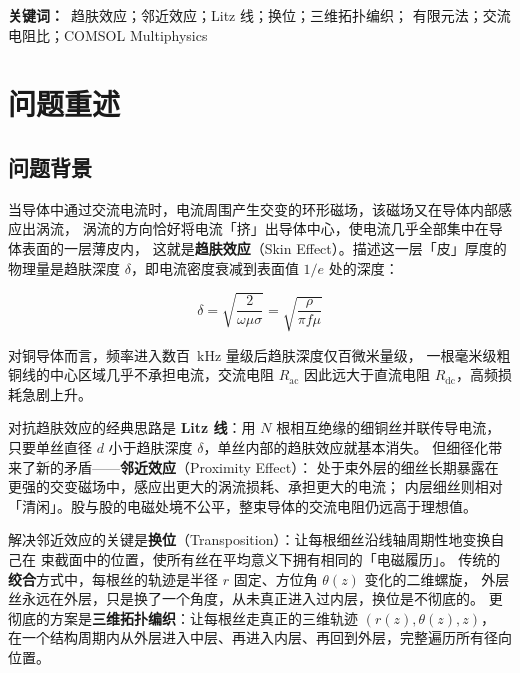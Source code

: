 \documentclass[12pt, a4paper]{ctexart}
\newcommand{\Rac}{R_{\mathrm{ac}}}
\newcommand{\Rdc}{R_{\mathrm{dc}}}
\newcommand{\U}[1]{\ensuremath{\,\mathrm{#1}}}
\begin{document}
\vspace{8pt}
\noindent\textbf{关键词：}\ 趋肤效应；邻近效应；Litz 线；换位；三维拓扑编织；
有限元法；交流电阻比；COMSOL Multiphysics

\newpage
\tableofcontents
\newpage

\section{问题重述}

\subsection{问题背景}

当导体中通过交流电流时，电流周围产生交变的环形磁场，该磁场又在导体内部感应出涡流，
涡流的方向恰好将电流「挤」出导体中心，使电流几乎全部集中在导体表面的一层薄皮内，
这就是\textbf{趋肤效应}（Skin Effect）。描述这一层「皮」厚度的物理量是趋肤深度
$\delta$，即电流密度衰减到表面值 $1/e$ 处的深度：

\begin{equation}
\delta = \sqrt{\frac{2}{\omega\mu\sigma}} = \sqrt{\frac{\rho}{\pi f \mu}}
\label{eq:delta}
\end{equation}

对铜导体而言，频率进入数百 $\U{kHz}$ 量级后趋肤深度仅百微米量级，
一根毫米级粗铜线的中心区域几乎不承担电流，交流电阻 $\Rac$ 因此远大于直流电阻
$\Rdc$，高频损耗急剧上升。

对抗趋肤效应的经典思路是 \textbf{Litz 线}：用 $N$ 根相互绝缘的细铜丝并联传导电流，
只要单丝直径 $d$ 小于趋肤深度 $\delta$，单丝内部的趋肤效应就基本消失。
但细径化带来了新的矛盾——\textbf{邻近效应}（Proximity Effect）：
处于束外层的细丝长期暴露在更强的交变磁场中，感应出更大的涡流损耗、承担更大的电流；
内层细丝则相对「清闲」。股与股的电磁处境不公平，整束导体的交流电阻仍远高于理想值。

解决邻近效应的关键是\textbf{换位}（Transposition）：让每根细丝沿线轴周期性地变换自己在
束截面中的位置，使所有丝在平均意义下拥有相同的「电磁履历」。
传统的\textbf{绞合}方式中，每根丝的轨迹是半径 $r$ 固定、方位角 $\theta(z)$ 变化的二维螺旋，
外层丝永远在外层，只是换了一个角度，从未真正进入过内层，换位是不彻底的。
更彻底的方案是\textbf{三维拓扑编织}：让每根丝走真正的三维轨迹 $(r(z),\theta(z),z)$，
在一个结构周期内从外层进入中层、再进入内层、再回到外层，完整遍历所有径向位置。
\end{document}
